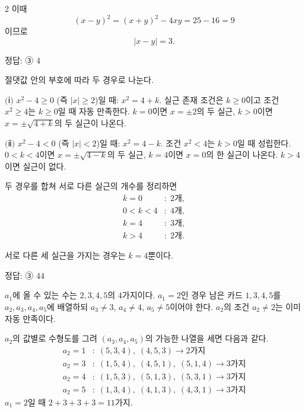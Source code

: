 \documentclass[10pt]{article}
\begin{document}
\begin{multicols}{2}
이때
\[ (x - y)^2 = (x + y)^2 - 4xy = 25 - 16 = 9 \]
이므로
\[ |x - y| = 3. \]

\begin{answerbox}정답: ③ $4$\end{answerbox}

절댓값 안의 부호에 따라 두 경우로 나눈다.

$(\!$ⅰ$)$ $x^2 - 4 \ge 0$ (즉 $|x| \ge 2$)일 때: $x^2 = 4 + k$. 실근 존재 조건은 $k \ge 0$이고 조건 $x^2 \ge 4$는 $k \ge 0$일 때 자동 만족한다. $k = 0$이면 $x = \pm 2$의 두 실근, $k > 0$이면 $x = \pm\sqrt{4 + k}$의 두 실근이 나온다.

$(\!$ⅱ$)$ $x^2 - 4 < 0$ (즉 $|x| < 2$)일 때: $x^2 = 4 - k$. 조건 $x^2 < 4$는 $k > 0$일 때 성립한다. $0 < k < 4$이면 $x = \pm\sqrt{4 - k}$의 두 실근, $k = 4$이면 $x = 0$의 한 실근이 나온다. $k > 4$이면 실근이 없다.

두 경우를 합쳐 서로 다른 실근의 개수를 정리하면
\begin{align*}
k = 0 &:\; 2\text{개},\\
0 < k < 4 &:\; 4\text{개},\\
k = 4 &:\; 3\text{개},\\
k > 4 &:\; 2\text{개}.
\end{align*}

서로 다른 세 실근을 가지는 경우는 $k = 4$뿐이다.

\begin{answerbox}정답: ③ $44$\end{answerbox}

$a_1$에 올 수 있는 수는 $2, 3, 4, 5$의 $4$가지이다. $a_1 = 2$인 경우 남은 카드 $1, 3, 4, 5$를 $a_2, a_3, a_4, a_5$에 배열하되 $a_3 \ne 3$, $a_4 \ne 4$, $a_5 \ne 5$이어야 한다. $a_2$의 조건 $a_2 \ne 2$는 이미 자동 만족이다.

$a_2$의 값별로 수형도를 그려 $(a_3, a_4, a_5)$의 가능한 나열을 세면 다음과 같다.
\begin{align*}
a_2 = 1 &:\; (5, 3, 4),\; (4, 5, 3) \to 2\text{가지} \\
a_2 = 3 &:\; (1, 5, 4),\; (4, 5, 1),\; (5, 1, 4) \to 3\text{가지} \\
a_2 = 4 &:\; (1, 5, 3),\; (5, 1, 3),\; (5, 3, 1) \to 3\text{가지} \\
a_2 = 5 &:\; (1, 3, 4),\; (4, 1, 3),\; (4, 3, 1) \to 3\text{가지}
\end{align*}
$a_1 = 2$일 때 $2 + 3 + 3 + 3 = 11$가지.


\end{multicols}
\end{document}
